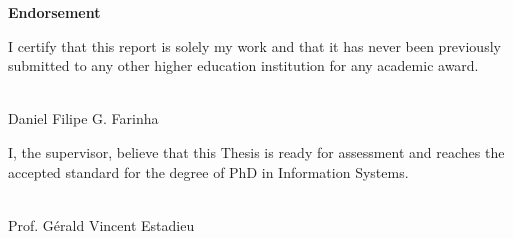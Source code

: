 \clearpage
\thispagestyle{empty}
\vspace*{\fill}

\begin{center}
    \textbf{\Huge Endorsement}
\end{center}

\vspace{2cm}

\begin{minipage}[t]{0.45\textwidth}
    I certify that this report is solely my work and that it has never been previously submitted to any other higher education institution for any academic award.
    \vspace{2cm} \\
   
    \hrulefill \\
    \vspace{0.5cm}

    
    \centering
    Daniel Filipe G. Farinha

\end{minipage}
\hfill
\begin{minipage}[t]{0.45\textwidth}
    I, the supervisor, believe that this Thesis is ready for assessment and reaches the accepted standard for the degree of PhD in Information Systems.
    \vspace{2cm} \\
    
    \hrulefill \\
    \vspace{0.5cm}
    
    \centering
    Prof. Gérald Vincent Estadieu

\end{minipage}

\vspace*{\fill}
\clearpage